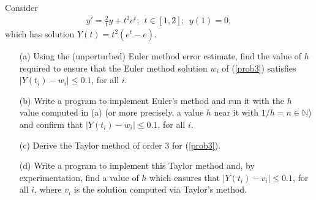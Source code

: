 \documentclass[8pt]{article}
\theoremstyle{definition}
\newenvironment{exercise}[1]
  {\renewcommand\theinnerexercise{#1}\innerexercise}
  {\endinnerexercise}
\begin{document}
\newpage


\begin{exercise}{3}
Consider 
\begin{align}
y' = \frac{2}{t} y + t^2 e^t; \ \ t \in [1, 2]; \ \ y(1) = 0, \label{prob3}
\end{align}
which has solution $Y(t) = t^2 (e^t - e)$.
\begin{enumerate}
\item[(a)] Using the (unperturbed) Euler method error estimate, find the value of $h$ required to ensure that the Euler method solution $w_i$ of (\ref{prob3}) satisfies $|Y(t_i) - w_i| \leq 0.1$, for all $i$.
\item[(b)] Write a program to implement Euler's method and run it with the $h$ value computed in (a) (or more precisely, a value $h$ near it with $1/h = n \in \mathbb{N}$) and confirm that $|Y(t_i) - w_i| \leq 0.1$, for all $i$.
\item[(c)] Derive the Taylor method of order 3 for (\ref{prob3}).
\item[(d)] Write a program to implement this Taylor method and, by experimentation, find a value of $h$ which ensures that $|Y(t_i) - v_i| \leq 0.1$, for all $i$, where $v_i$ is the solution computed via Taylor's method.
\end{enumerate}
\end{exercise}
\end{document}
